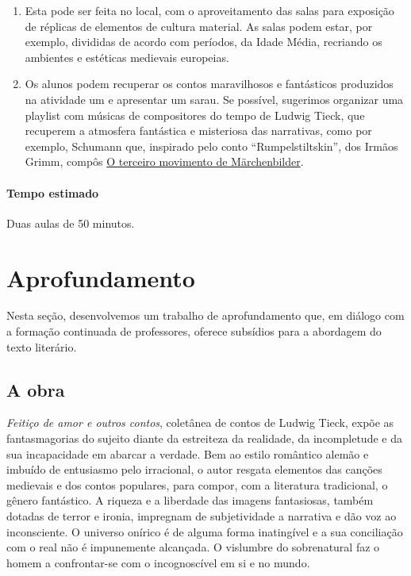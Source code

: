 \documentclass[12pt]{extarticle}
\begin{document}
\begin{enumerate}



\item
Esta pode ser feita no local, com o aproveitamento das salas para exposição 
de réplicas de elementos de cultura material. As salas podem estar, por exemplo, 
divididas de acordo com períodos, da Idade Média, recriando os ambientes e estéticas 
medievais europeias.

\item
Os alunos podem recuperar os contos maravilhosos e fantásticos produzidos na atividade um e 
apresentar um sarau. 
Se possível, sugerimos organizar uma playlist com músicas de compositores do tempo de Ludwig Tieck, que
recuperem a atmosfera fantástica e misteriosa das narrativas, como por exemplo, Schumann que, inspirado 
pelo conto ``Rumpelstiltskin'', dos Irmãos Grimm, compôs \href{https://www.youtube.com/watch?v=zaX0IjTMChI&ab_channel=PacoM}{O terceiro movimento de Märchenbilder}.

\end{enumerate}

\paragraph{Tempo estimado} Duas aulas de 50 minutos. 


\section{Aprofundamento}

Nesta seção, desenvolvemos um trabalho de aprofundamento que, em diálogo
com a formação continuada de professores, oferece subsídios para a
abordagem do texto literário.

\subsection{A obra}

\emph{Feitiço de amor e outros contos}, coletânea de contos de Ludwig Tieck,
expõe as fantasmagorias do sujeito diante da estreiteza da realidade, da
incompletude e da sua incapacidade em abarcar a verdade. Bem ao estilo
romântico alemão e imbuído de entusiasmo pelo irracional, o autor
resgata elementos das canções medievais e dos contos populares, para
compor, com a literatura tradicional, o gênero fantástico. A riqueza e a
liberdade das imagens fantasiosas, também dotadas de terror e ironia,
impregnam de subjetividade a narrativa e dão voz ao inconsciente. O
universo onírico é de alguma forma inatingível e a sua conciliação com o
real não é impunemente alcançada. O vislumbre do sobrenatural faz o
homem a confrontar-se com o incognoscível em si e no mundo.
\end{document}
